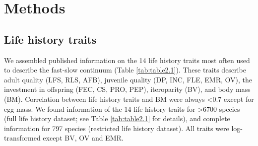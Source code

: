 \section{Methods}

\subsection*{Life history traits}

We assembled published information on the 14 life history traits most often used
to describe the fast-slow continuum (Table \ref{tab:table2.1}). These traits
describe adult quality (LFS, RLS, AFB), juvenile quality (DP, INC, FLE, EMR,
OV), the investment in offspring (FEC, CS, PRO, PEP), iteroparity (BV), and body
mass (BM). Correlation between life history traits and BM were always
\textless{0.7} except for egg mass.
We found information of the 14 life history traits for \textgreater{6700}
species (full life history dataset; see Table \ref{tab:table2.1} for details),
and complete information for 797 species (restricted life history dataset). All
traits were log-transformed except BV, OV and EMR.


